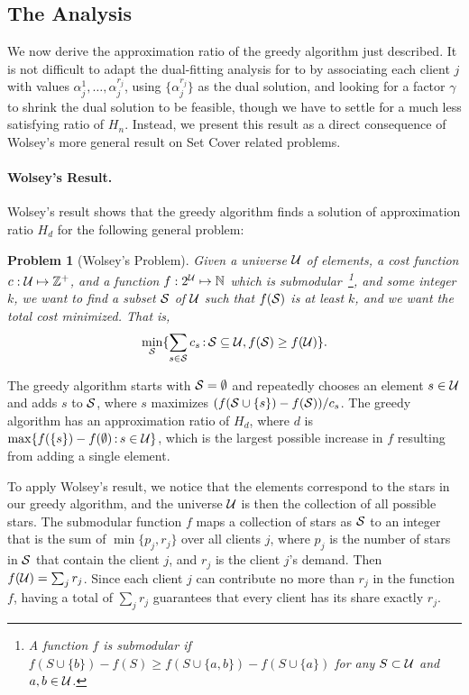 \documentclass[oneside,final]{ucr}
\newtheorem{problem}[theorem]{Problem}
\begin{document}
\subsection{The Analysis}
We now derive the approximation ratio of the greedy
algorithm just described. It is not difficult to adapt the
dual-fitting analysis for {\UFL} to {\FTFP} by associating
each client $j$ with values
$\alpha_j^1,\ldots,\alpha_j^{r_j}$, using
$\{\alpha_j^{r_j}\}$ as the dual solution, and looking for a
factor $\gamma$ to shrink the dual solution to be feasible,
though we have to settle for a much less satisfying ratio of
$H_n$. Instead, we present this result as a direct
consequence of Wolsey's more general result on Set Cover
related problems.

\paragraph{Wolsey's Result.}
Wolsey's result shows that the greedy algorithm finds a
solution of approximation ratio $H_d$ for the following
general problem:

\begin{problem}[Wolsey's Problem]
  Given a universe $\calU$ of elements, a cost function $c:
  \calU \mapsto \mathbb{Z}^+$, and a function $f : 2^\calU
  \mapsto \mathbb{N}$ which is submodular~\footnote{A
    function $f$ is submodular if $f(S \cup \{b\}) -
    f(S) \geq f(S \cup \{a,b\}) - f (S \cup \{a\})$ for
    any $S \subset \calU$ and $a, b \in \calU$.}, and some
  integer $k$, we want to find a subset $\calS$ of $\calU$
  such that $f(\calS)$ is at least $k$, and we want the
  total cost minimized. That is,
\begin{equation*}
  \min_{\calS} \{ \sum_{s\in\calS} c_s \suchthat
  \calS\subseteq \calU, f(\calS) \geq f(\calU)\}.
\end{equation*}
\end{problem}

The greedy algorithm starts with $\calS = \emptyset$ and
repeatedly chooses an element $s \in \calU$ and adds $s$ to
$\calS$, where $s$ maximizes $(f(\calS \cup \{s\}) -
f(\calS)) / c_s$. The greedy algorithm has an approximation
ratio of $H_d$, where $d$ is $\max\{f(\{s\}) - f(\emptyset)
\suchthat s \in \calU\}$, which is the largest possible
increase in $f$ resulting from adding a single element.

To apply Wolsey's result, we notice that the elements
correspond to the stars in our greedy algorithm, and the
universe $\calU$ is then the collection of all possible
stars. The submodular function $f$ maps a collection of
stars as $\calS$ to an integer that is the sum of
$\min\{p_j, r_j\}$ over all clients $j$, where $p_j$ is the
number of stars in $\calS$ that contain the client $j$, and
$r_j$ is the client $j$'s demand. Then $f(\calU) = \sum_{j}
r_j$. Since each client $j$ can contribute no more than
$r_j$ in the function $f$, having a total of $\sum_j r_j$
guarantees that every client has its share exactly $r_j$.
\end{document}
